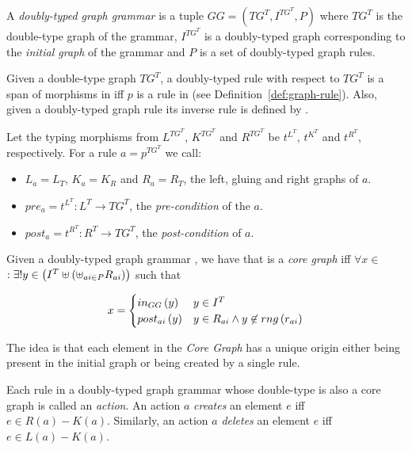 \begin{definition} A \emph{doubly-typed graph grammar} is a tuple $GG = \left(TG^T, I^{TG^T},P \right)$ where $TG^T$ is the double-type graph of the grammar, $I^{TG^T}$ is a doubly-typed graph corresponding to the \emph{initial graph} of the grammar and $P$ is a set of doubly-typed graph rules. 
\end{definition}

\begin{definition} Given a double-type graph $TG^T$, a doubly-typed rule with respect to $TG^T$ is a span of morphisms \doublyTypedRule{} in \doublyTypedGraphCategory{} iff $p$ is a rule in \typedGraphCategory{} (see Definition~\ref{def:graph-rule}). Also, given a doubly-typed graph rule \doublyTypedRule{} its inverse rule is defined by \inverseDoublyTypedRule{}.

  Let the typing morphisms from $L^{TG^T}$, $K^{TG^T}$ and $R^{TG^T}$ be $t^{L^T}$, $t^{K^T}$ and $t^{R^T}$, respectively. For a rule $a = p^{TG^T}$ we call:

  \begin{itemize}
    \item $L_a = L_T$, $K_a = K_R$ and $R_a = R_T$, the left, gluing and right graphs of $a$.
    \item $pre_a = t^{L^T} : L^T \rightarrow TG^T$, the \emph{pre-condition} of the $a$.
    \item $post_a = t^{R^T} : R^T \rightarrow TG^T$, the \emph{post-condition} of $a$.
  \end{itemize}
\end{definition}

\begin{definition} Given a doubly-typed graph grammar \doublyTypedGraphGrammarCore{}, we have that \coreGraph{} is a \emph{core graph} iff $\forall x \in$ \coreGraph $: \exists! y \in \left(I^T \uplus \left(\uplus_{ai \in P} R_{ai}\right)\right)$ such that

  \[ x =
    \begin{cases}
      in_{GG}\left(y\right) & y \in I^T\\
      post_{ai}\left(y\right) & y \in R_{ai} \land y \not\in rng\left(r_{ai}\right)\\
    \end{cases}
   \]

  \begin{intuition} The idea is that each element in the \emph{Core Graph} has a unique origin either being present in the initial graph or being created by a single rule.
\end{intuition}

  Each rule in a doubly-typed graph grammar whose double-type is also a core graph is called an \emph{action}. An action $a$ \emph{creates} an element $e$ iff $e \in R(a) - K(a)$. Similarly, an action $a$ \emph{deletes} an element $e$ iff $e \in L(a) - K(a)$.

\end{definition}

